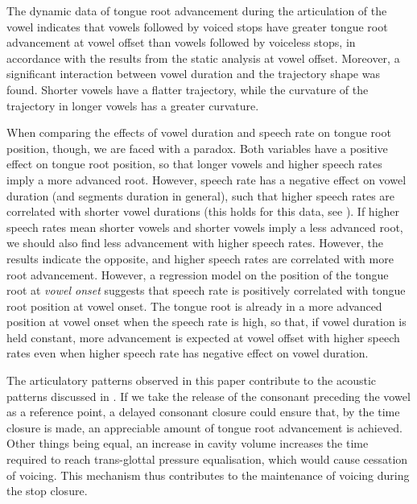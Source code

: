 \documentclass[12pt,]{article}
\begin{document}
The dynamic data of tongue root advancement during the articulation of
the vowel indicates that vowels followed by voiced stops have greater
tongue root advancement at vowel offset than vowels followed by
voiceless stops, in accordance with the results from the static analysis
at vowel offset. Moreover, a significant interaction between vowel
duration and the trajectory shape was found. Shorter vowels have a
flatter trajectory, while the curvature of the trajectory in longer
vowels has a greater curvature.

When comparing the effects of vowel duration and speech rate on tongue
root position, though, we are faced with a paradox. Both variables have
a positive effect on tongue root position, so that longer vowels and
higher speech rates imply a more advanced root. However, speech rate has
a negative effect on vowel duration (and segments duration in general),
such that higher speech rates are correlated with shorter vowel
durations (this holds for this data, see \citealt{coretta2018j}). If
higher speech rates mean shorter vowels and shorter vowels imply a less
advanced root, we should also find less advancement with higher speech
rates. However, the results indicate the opposite, and higher speech
rates are correlated with more root advancement. However, a regression
model on the position of the tongue root at \emph{vowel onset} suggests
that speech rate is positively correlated with tongue root position at
vowel onset. The tongue root is already in a more advanced position at
vowel onset when the speech rate is high, so that, if vowel duration is
held constant, more advancement is expected at vowel offset with higher
speech rates even when higher speech rate has negative effect on vowel
duration.

The articulatory patterns observed in this paper contribute to the
acoustic patterns discussed in \citet{coretta2018j}. If we take the
release of the consonant preceding the vowel as a reference point, a
delayed consonant closure could ensure that, by the time closure is
made, an appreciable amount of tongue root advancement is achieved.
Other things being equal, an increase in cavity volume increases the
time required to reach trans-glottal pressure equalisation, which would
cause cessation of voicing. This mechanism thus contributes to the
maintenance of voicing during the stop closure.
\end{document}

